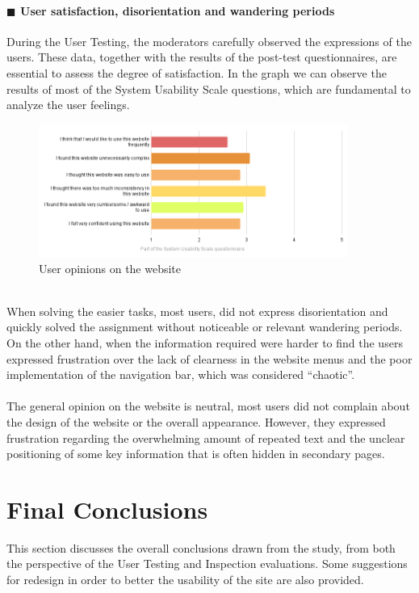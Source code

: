 \documentclass[11pt]{article} %
\begin{document}
\paragraph{$\blacksquare$ User satisfaction, disorientation and wandering periods}
During the User Testing, the moderators carefully observed the expressions of the users. These data, together with the results of the post-test questionnaires, are essential to assess the degree of satisfaction.
In the graph we can observe the results of most of the System Usability Scale questions, which are fundamental to analyze the user feelings.
\begin{figure}[ht]
  \centering
    \includegraphics[width=0.9\textwidth]{Images/feelings.png}
    \caption{User opinions on the website}
\end{figure}\\
When solving the easier tasks, most users, did not express disorientation and quickly solved the assignment without noticeable or relevant wandering periods. On the other hand, when the information required were harder to find the users expressed frustration over the lack of clearness in the website menus and the poor implementation of the navigation bar, which was considered “chaotic”.
\\\\
The general opinion on the website is neutral, most users did not complain about the design of the website or the overall appearance. However, they expressed frustration regarding the overwhelming amount of repeated text and the unclear positioning of some key information that is often hidden in secondary pages.
\section{Final Conclusions}
This section discusses the overall conclusions drawn from the study, from both the perspective of the User Testing and Inspection evaluations. Some suggestions for redesign in order to better the usability of the site are also provided.
\end{document}
